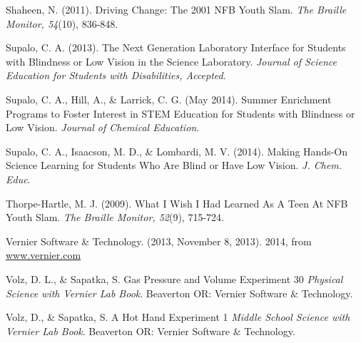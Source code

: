 \documentclass[11.5pt]{sig-alternate} %
\begin{document}
Shaheen, N. (2011). Driving Change: The 2001 NFB Youth Slam. \textit{The Braille Monitor, 54}(10), 836-848. 

Supalo, C. A. (2013). The Next Generation Laboratory Interface for Students with Blindness or Low Vision in the Science Laboratory. \textit{Journal of Science Education for Students with Disabilities, Accepted}. 

Supalo, C. A., Hill, A., \& Larrick, C. G. (May 2014). Summer Enrichment Programs to Foster Interest in STEM Education for Students with Blindness or Low Vision. \textit{Journal of Chemical Education}. 

Supalo, C. A., Isaacson, M. D., \& Lombardi, M. V. (2014). Making Hands-On Science Learning for Students Who Are Blind or Have Low Vision. \textit{J. Chem. Educ}. 

Thorpe-Hartle, M. J. (2009). What I Wish I Had Learned As A Teen At NFB Youth Slam. \textit{The Braille Monitor, 52}(9), 715-724. 

Vernier Software \& Technology. (2013, November 8, 2013). 2014, from \url{www.vernier.com}

Volz, D. L., \& Sapatka, S. Gas Pressure and Volume Experiment 30 \textit{Physical Science with Vernier Lab Book}. Beaverton OR: Vernier Software \& Technology.

Volz, D., \& Sapatka, S. A Hot Hand Experiment 1 \textit{Middle School Science with Vernier Lab Book}. Beaverton OR: Vernier Software \& Technology.
\end{document}
